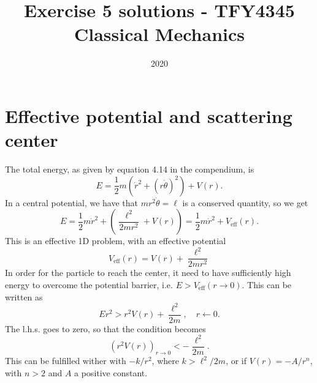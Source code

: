 \documentclass{article}
\title{Exercise 5 solutions - TFY4345 Classical Mechanics}
\date{2020}
\begin{document}
    \maketitle
    \section{Effective potential and scattering center}
        The total energy, as given by equation 4.14 in the compendium, is
        \begin{equation*}
            E = \frac{1}{2}m\left( \dot r^2 + (r\dot \theta)^2 \right) + V(r).
        \end{equation*}
        In a central potential, we have that $mr^2 \dot \theta = \ell$  is a conserved quantity, so we get 
        \begin{equation*}
            E = \frac{1}{2} m \dot r^2 + \left(\frac{\ell^2}{2 m r^2} + V(r) \right) = \frac{1}{2}m \dot r^2 + V_{\mathrm{eff}}(r).
        \end{equation*}
        This is an effective 1D problem, with an effective potential 
        \begin{equation*}
            V_{\mathrm{eff}}(r) = V(r) + \frac{\ell^2}{2 m r^2}
        \end{equation*}
        In order for the particle to reach the center, it need to have sufficiently high energy to overcome the potential barrier, i.e. $E > V_{\mathrm{eff}}(r \rightarrow 0)$. This can be written as
        \begin{equation*}
            E r^2 > r^2 V(r) + \frac{\ell^2}{2 m}, \quad r \leftarrow 0.
        \end{equation*}
        The l.h.s. goes to zero, so that the condition becomes 
        \begin{equation*}
            (r^2V(r))_{r \rightarrow 0} < - \frac{\ell^2}{2m}.
        \end{equation*}
        This can be fulfilled wither with $- k / r^2$, where $k > \ell^2 / 2m$, or if $V(r) = - A/r^n$, with $n > 2$ and $A$ a positive constant.
\end{document}
